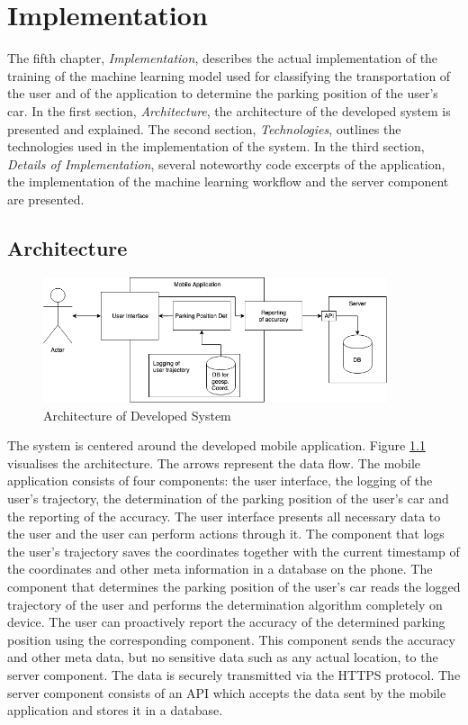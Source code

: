 \chapter{Implementation}
The fifth chapter, \textit{Implementation}, describes the actual implementation of the training of the machine learning model used for classifying the transportation of the user and of the application to determine the parking position of the user's car. 
In the first section, \textit{Architecture}, the architecture of the developed system is presented and explained.
The second section, \textit{Technologies}, outlines the technologies used in the implementation of the system.
In the third section, \textit{Details of Implementation}, several noteworthy code excerpts of the application, the implementation of the machine learning workflow and the server component are presented.

\section{Architecture}

\begin{figure}[h]
    \centering
    \includegraphics[width=0.9\textwidth]{images/architecture.png}
    \caption{Architecture of Developed System}
    \label{fig:architecture}
\end{figure}


The system is centered around the developed mobile application. Figure \ref{fig:architecture} visualises the architecture. The arrows represent the data flow.  The mobile application consists of four components: the user interface, the logging of  the user's trajectory, the determination of the parking position of the user's car and the reporting of the accuracy. The user interface presents all necessary data to the user and the user can perform actions through it. The component that logs the user's trajectory saves the coordinates together with the current timestamp of the coordinates and other meta information in a database on the phone. The component that determines the parking position of the user's car reads the logged trajectory of the user and performs the determination algorithm completely on device. The user can proactively report the accuracy of the determined parking position using the corresponding component. This component sends the accuracy and other meta data, but no sensitive data such as any actual location, to the server component. The data is securely transmitted via the HTTPS protocol. The server component consists of an API which accepts the data sent by the mobile application and stores it in a database.

